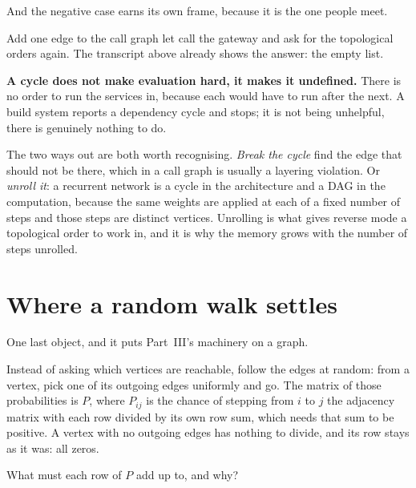 \begin{fr}
And the negative case earns its own frame, because it is the one people meet.

Add one edge to the call graph \dash{} let  call the gateway \dash{}
and ask for the topological orders again. The transcript above already shows
the answer: the empty list.

\begin{trapbox}
\textbf{A cycle does not make evaluation hard, it makes it undefined.} There is
no order to run the services in, because each would have to run after the
next. A build system reports a dependency cycle and stops; it is not being
unhelpful, there is genuinely nothing to do.

The two ways out are both worth recognising. \emph{Break the cycle} \dash{}
find the edge that should not be there, which in a call graph is usually a
layering violation. Or \emph{unroll it}: a recurrent network is a cycle in the
architecture and a DAG in the computation, because the same weights are
applied at each of a fixed number of steps and those steps are distinct
vertices. Unrolling is what gives reverse mode a topological order to work
in, and it is why the memory grows with the number of steps unrolled.
\end{trapbox}
\end{fr}

\section{Where a random walk settles}
\label{sec:P13-walks-random}

\begin{fr}
One last object, and it puts Part~III's machinery on a graph.

Instead of asking which vertices are reachable, follow the edges at random:
from a vertex, pick one of its outgoing edges uniformly and go. The matrix of
those probabilities is $P$, where $P_{ij}$ is the chance of stepping from $i$
to $j$ \dash{} the adjacency matrix with each row divided by its own row sum,
which needs that sum to be positive. A vertex with no outgoing edges has
nothing to divide, and its row stays as it was: all zeros.

What must each row of $P$ add up to, and why?
\dotline
\nextframe
\end{fr}

